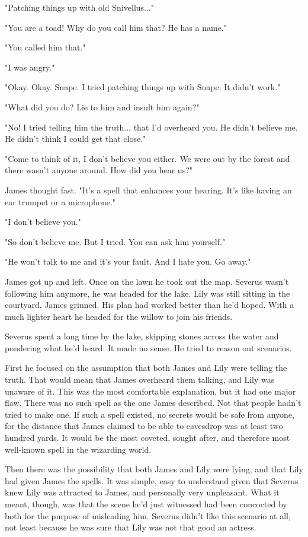 "Patching things up with old Snivellus..."

"You are a toad! Why do you call him that? He has a name."

"You called him that."

"I was angry."

"Okay. Okay. Snape. I tried patching things up with Snape. It didn't work."

"What did you do? Lie to him and insult him again?"

"No! I tried telling him the truth... that I'd overheard you. He didn't believe me. He didn't think I could get that close."

"Come to think of it, I don't believe you either. We were out by the forest and there wasn't anyone around. How did you hear us?"

James thought fast. "It's a spell that enhances your hearing. It's like having an ear trumpet or a microphone."

"I don't believe you."

"So don't believe me. But I tried. You can ask him yourself."

"He won't talk to me and it's your fault. And I hate you. Go away."

James got up and left. Once on the lawn he took out the map. Severus wasn't following him anymore, he was headed for the lake. Lily was still sitting in the courtyard. James grinned. His plan had worked better than he'd hoped. With a much lighter heart he headed for the willow to join his friends.

Severus spent a long time by the lake, skipping stones across the water and pondering what he'd heard. It made no sense. He tried to reason out scenarios.

First he focused on the assumption that both James and Lily were telling the truth. That would mean that James overheard them talking, and Lily was unaware of it. This was the most comfortable explanation, but it had one major flaw. There was no such spell as the one James described. Not that people hadn't tried to make one. If such a spell existed, no secrets would be safe from anyone, for the distance that James claimed to be able to eavesdrop was at least two hundred yards. It would be the most coveted, sought after, and therefore most well-known spell in the wizarding world.

Then there was the possibility that both James and Lily were lying, and that Lily had given James the spells. It was simple, easy to understand given that Severus knew Lily was attracted to James, and personally very unpleasant. What it meant, though, was that the scene he'd just witnessed had been concocted by both for the purpose of misleading him. Severus didn't like this scenario at all, not least because he was sure that Lily was not that good an actress.

